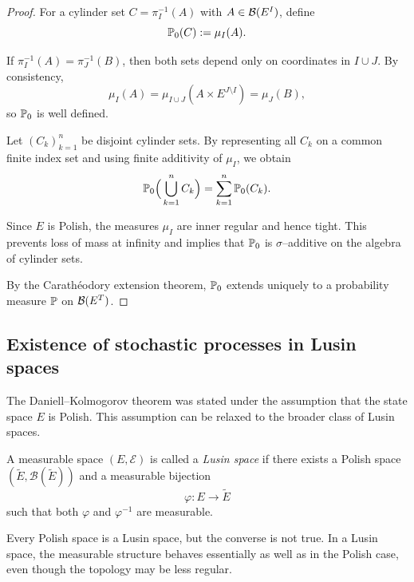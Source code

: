 \begin{proof}

For a cylinder set $C = \pi_I^{-1}(A)$ with $A \in \mathcal{B}(E^I)$, define
\[
\mathbb{P}_0(C) := \mu_I(A).
\]

If $\pi_I^{-1}(A) = \pi_J^{-1}(B)$, then both sets depend only on coordinates in $I\cup J$.
By consistency,
\[
\mu_I(A)
=
\mu_{I\cup J}(A \times E^{J\setminus I})
=
\mu_J(B),
\]
so $\mathbb{P}_0$ is well defined.

Let $(C_k)_{k=1}^n$ be disjoint cylinder sets.
By representing all $C_k$ on a common finite index set and using finite additivity of
$\mu_I$, we obtain
\[
\mathbb{P}_0\Big(\bigcup_{k=1}^n C_k\Big)
=
\sum_{k=1}^n \mathbb{P}_0(C_k).
\]

Since $E$ is Polish, the measures $\mu_I$ are inner regular and hence tight.
This prevents loss of mass at infinity and implies that $\mathbb{P}_0$ is
$\sigma$--additive on the algebra of cylinder sets.

By the Carath\'eodory extension theorem, $\mathbb{P}_0$ extends uniquely to a probability
measure $\mathbb{P}$ on $\mathcal{B}(E^T)$.

\end{proof}

\subsection*{Existence of stochastic processes in Lusin spaces}

The Daniell--Kolmogorov theorem was stated under the assumption that the state space $E$
is Polish. This assumption can be relaxed to the broader class of Lusin spaces.

\begin{definition}
A measurable space $(E,\mathcal{E})$ is called a \emph{Lusin space} if there exists
a Polish space $(\tilde E,\mathcal{B}(\tilde E))$ and a measurable bijection
\[
\varphi : E \to \tilde E
\]
such that both $\varphi$ and $\varphi^{-1}$ are measurable.
\end{definition}

\begin{remark}
Every Polish space is a Lusin space, but the converse is not true.
In a Lusin space, the measurable structure behaves essentially as well as in the Polish case,
even though the topology may be less regular.
\end{remark}

